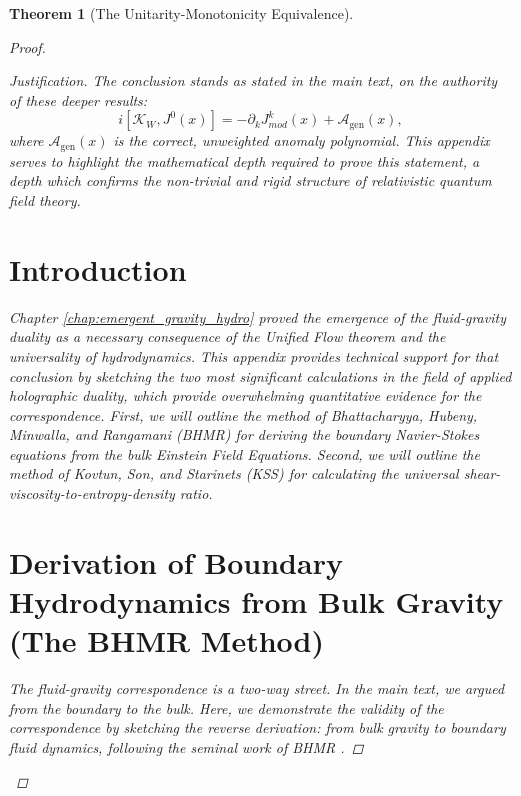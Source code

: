 \documentclass[11pt, letterpaper]{report}
\theoremstyle{plain} %
\newtheorem{theorem}{Theorem}[chapter]
\theoremstyle{definition} %
\theoremstyle{remark} %
\newcommand{\ModularK}{\mathcal{K}}
\begin{document}
\begin{theorem}[The Unitarity-Monotonicity Equivalence]
\begin{proof}
\begin{proof}[Justification]
The conclusion stands as stated in the main text, on the authority of these deeper results:
\begin{equation}
    i[\ModularK_W, J^0(x)] = -\partial_k J^k_{mod}(x) + \mathcal{A}_{\text{gen}}(x),
\end{equation}
where $\mathcal{A}_{\text{gen}}(x)$ is the correct, unweighted anomaly polynomial. This appendix serves to highlight the mathematical depth required to prove this statement, a depth which confirms the non-trivial and rigid structure of relativistic quantum field theory.






\appendix
{}
\label{app:fluid_gravity_support}

\section{Introduction}

Chapter \ref{chap:emergent_gravity_hydro} proved the emergence of the fluid-gravity duality as a necessary consequence of the Unified Flow theorem and the universality of hydrodynamics. This appendix provides technical support for that conclusion by sketching the two most significant calculations in the field of applied holographic duality, which provide overwhelming quantitative evidence for the correspondence. First, we will outline the method of Bhattacharyya, Hubeny, Minwalla, and Rangamani (BHMR) for deriving the boundary Navier-Stokes equations from the bulk Einstein Field Equations. Second, we will outline the method of Kovtun, Son, and Starinets (KSS) for calculating the universal shear-viscosity-to-entropy-density ratio.

\section{Derivation of Boundary Hydrodynamics from Bulk Gravity (The BHMR Method)}
\label{app:bhmr_method}

The fluid-gravity correspondence is a two-way street. In the main text, we argued from the boundary to the bulk. Here, we demonstrate the validity of the correspondence by sketching the reverse derivation: from bulk gravity to boundary fluid dynamics, following the seminal work of BHMR \cite{Bhattacharyya2008NonlinearFluid}.


\end{proof}
\end{proof}
\end{theorem}
\end{document}
